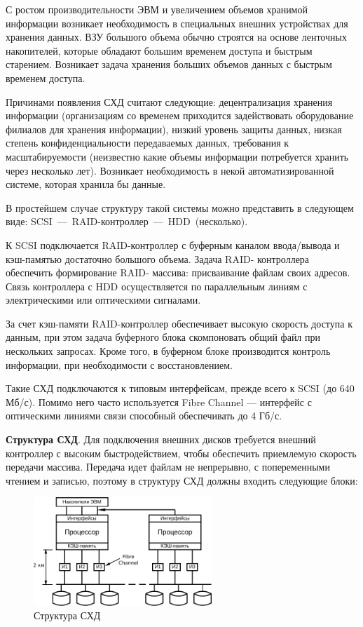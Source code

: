 \documentclass[unicode, 12pt, a4paper, oneside]{article}
\begin{document}
С ростом производительности ЭВМ и увеличением объемов хранимой информации возникает необходимость в специальных внешних устройствах для хранения данных. ВЗУ большого объема обычно строятся на основе ленточных накопителей, которые обладают большим временем доступа и быстрым старением. Возникает задача хранения больших объемов данных с быстрым временем доступа.

Причинами появления СХД считают следующие: децентрализация хранения информации (организациям со временем приходится задействовать оборудование филиалов для хранения информации), низкий уровень защиты данных, низкая степень конфиденциальности передаваемых данных, требования к масштабируемости (неизвестно какие объемы информации потребуется хранить через несколько лет). Возникает необходимость в некой автоматизированной системе, которая хранила бы данные.

В простейшем случае структуру такой системы можно представить в следующем виде: \mbox{SCSI --- RAID-контроллер --- HDD (несколько)}.

К SCSI подключается RAID-контроллер с буферным каналом ввода/вывода и кэш-памятью достаточно большого объема. Задача RAID- контроллера обеспечить формирование RAID- массива: присваивание файлам своих адресов. Связь контроллера с HDD осуществляется по параллельным линиям с электрическими или оптическими сигналами.

За счет кэш-памяти RAID-контроллер обеспечивает высокую скорость доступа к данным, при этом задача буферного блока скомпоновать общий файл при нескольких запросах. Кроме того, в буферном блоке производится контроль информации, при необходимости с восстановлением.

Такие СХД подключаются к типовым интерфейсам, прежде всего к SCSI (до 640 Мб/с). Помимо него часто используется Fibre Channel --- интерфейс с оптическими линиями связи способный обеспечивать до 4 Гб/с.

\textbf{Структура СХД}. Для подключения внешних дисков требуется внешний контроллер с высоким быстродействием, чтобы обеспечить приемлемую скорость передачи массива. Передача идет файлам не непрерывно, с попеременными чтением и записью, поэтому в структуру СХД должны входить следующие блоки:

\begin{figure}[H]
\centering
\includegraphics[width=0.6\textwidth]{151_struct.pdf}
\caption{Структура СХД}
\end{figure}
\end{document}
